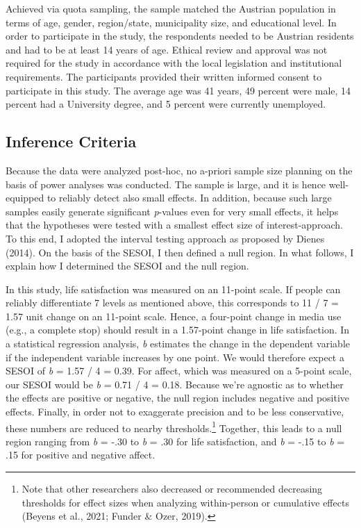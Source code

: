 \documentclass[
  man,mask]{apa7}
\begin{document}
Achieved via quota sampling, the sample matched the Austrian population in terms of age, gender, region/state, municipality size, and educational level.
In order to participate in the study, the respondents needed to be Austrian residents and had to be at least 14 years of age.
Ethical review and approval was not required for the study in accordance with the local legislation and institutional requirements.
The participants provided their written informed consent to participate in this study.
The average age was 41 years, 49 percent were male, 14 percent had a University degree, and 5 percent were currently unemployed.

\hypertarget{inference-criteria}{%
\subsection{Inference Criteria}\label{inference-criteria}}

Because the data were analyzed post-hoc, no a-priori sample size planning on the basis of power analyses was conducted.
The sample is large, and it is hence well-equipped to reliably detect also small effects.
In addition, because such large samples easily generate significant \emph{p}-values even for very small effects, it helps that the hypotheses were tested with a smallest effect size of interest-approach.
To this end, I adopted the interval testing approach as proposed by Dienes (2014).
On the basis of the SESOI, I then defined a null region.
In what follows, I explain how I determined the SESOI and the null region.

In this study, life satisfaction was measured on an 11-point scale.
If people can reliably differentiate 7 levels as mentioned above, this corresponds to 11 / 7 = 1.57 unit change on an 11-point scale.
Hence, a four-point change in media use (e.g., a complete stop) should result in a 1.57-point change in life satisfaction.
In a statistical regression analysis, \emph{b} estimates the change in the dependent variable if the independent variable increases by one point.
We would therefore expect a SESOI of \emph{b} = 1.57 / 4 = 0.39.
For affect, which was measured on a 5-point scale, our SESOI would be \emph{b} = 0.71 / 4 = 0.18.
Because we're agnostic as to whether the effects are positive or negative, the null region includes negative and positive effects.
Finally, in order not to exaggerate precision and to be less conservative, these numbers are reduced to nearby thresholds.\footnote{Note that other researchers also decreased or recommended decreasing thresholds for effect sizes when analyzing within-person or cumulative effects (Beyens et al., 2021; Funder \& Ozer, 2019).}
Together, this leads to a null region ranging from \emph{b} = -.30 to \emph{b} = .30 for life satisfaction, and \emph{b} = -.15 to \emph{b} = .15 for positive and negative affect.
\end{document}
